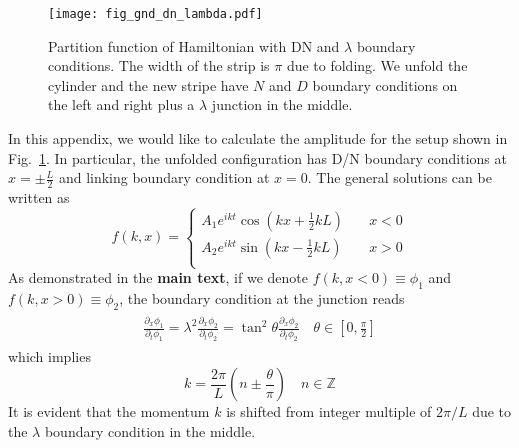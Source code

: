
\begin{figure}[h]
\centering
\texttt{[image: fig\_gnd\_dn\_lambda.pdf]}
\caption{Partition function of Hamiltonian with DN and $\lambda$ boundary conditions. The width of the strip is $\pi$ due to folding. We unfold the cylinder and the new stripe have $N$ and $D$ boundary conditions on the left and right plus a $\lambda$ junction in the middle. }
\label{fig:Fig_gnd_dn_lambda}
\end{figure}

In this appendix, we would like to calculate the amplitude for the setup shown in Fig.~\ref{fig:Fig_gnd_dn_lambda}. In particular, the unfolded configuration has D/N boundary conditions at $x = \pm \frac{L}{2}$ and linking boundary condition at $x = 0$. The general solutions can be written as
\begin{equation}
\label{eq:normalized_f}
f(k, x) = 
\left\lbrace
\begin{aligned}
  A_1 e^{i kt} \cos\left(kx +\frac{1}{2}kL \right) &  \quad x < 0  \\
  A_2 e^{ikt}  \sin\left(kx - \frac{1}{2}kL \right) & \quad x > 0   \\
\end{aligned} \right. 
\end{equation}
As demonstrated in the {\bf\color{red}main text}, if we denote $f(k,x<0)\equiv\phi_1$ and $f(k,x>0)\equiv\phi_2$, the boundary condition at the junction reads
\begin{eqnarray}\begin{aligned}
\frac{\partial_x \phi_1}{ \partial_t \phi_1} = \lambda^2 \frac{\partial_x \phi_2}{ \partial_t \phi_2} = \tan^2 \theta\frac{\partial_x \phi_2}{ \partial_t \phi_2} \quad \theta \in \left[0,\frac{\pi}{2} \right]  
\end{aligned}\end{eqnarray}
which implies
\begin{equation}
\label{eq:momentum_gnd_dn_lambda}
k = \frac{2\pi}{L}\left( n \pm \frac{\theta}{\pi} \right)  \quad n\in\mathbb{Z}
\end{equation}
It is evident that the momentum $k$ is shifted from integer multiple of $2\pi/L$ due to the $\lambda$ boundary condition in the middle. 
